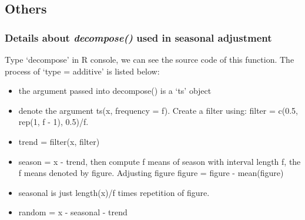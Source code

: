 \documentclass[a4paper,11pt]{article}
\begin{document}
\subsection{Others}
\subsubsection{Details about \textit{decompose()} used in seasonal adjustment}
Type `decompose' in R console, we can see the source code of this function. The process of `type = additive' is listed below:
\begin{itemize}
\item the argument passed into decompose() is a `ts' object 
\item denote the argument ts(x, frequency = f). Create a filter using: filter = c(0.5, rep(1, f - 1), 0.5)/f.
\item trend = filter(x, filter)
\item season = x - trend, then compute f means of season with interval length f, the f means denoted by figure. Adjusting figure figure = figure - mean(figure)
\item seasonal is just length(x)/f times repetition of figure.
\item random = x - seasonal - trend
\end{itemize}
\end{document}

